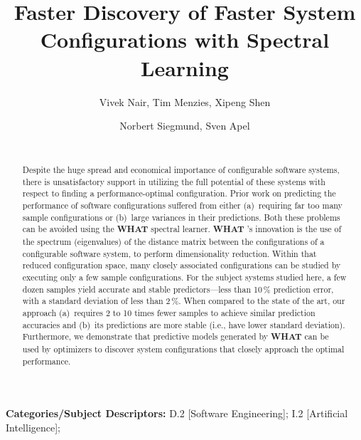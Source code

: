 \documentclass{newsig}
\newcommand{\what}{{\bf WHAT }}
\begin{document}
\title{Faster Discovery of Faster System Configurations with Spectral Learning} 
\author{
        \alignauthor Vivek Nair, Tim Menzies, Xipeng Shen 
        \\
    \and  
        \alignauthor Norbert Siegmund, Sven Apel \\
        \\
       }
\maketitle 
\thispagestyle{plain}
\pagestyle{plain}
\begin{abstract}
Despite the huge spread and economical importance of configurable software systems, there is  unsatisfactory support in utilizing the full potential of these systems with respect to finding a performance-optimal configuration.
Prior work on predicting the performance of software configurations suffered from either (a)~requiring far too many sample configurations or (b)~large variances in their predictions.
Both these problems can be avoided using the \what spectral learner.  
{\what}'s innovation is  
the use of the spectrum (eigenvalues) of the distance matrix
between the configurations of a configurable software system, to perform dimensionality reduction. Within that
reduced configuration space, many closely associated configurations can be studied
by executing only a few sample configurations. For the subject systems studied
here, a few dozen samples yield accurate and stable predictors---less than 10\,\% prediction error, with a standard deviation of less than 2\,\%.  
When compared to the state of the art, our approach (a)~requires 
2 to 10 times fewer samples to achieve similar prediction accuracies
and (b)~its predictions are  more stable (i.e., have lower standard
deviation). 
Furthermore, we demonstrate that predictive models generated by
\what can be used by optimizers to discover system configurations that closely approach the optimal performance.
\end{abstract}

\vspace{1mm}
\noindent
{\bf Categories/Subject Descriptors:} 
D.2 [Software Engineering];
I.2 [Artificial Intelligence];
\end{document}
